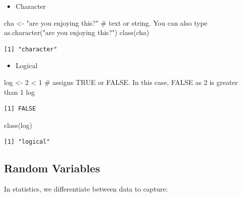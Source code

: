 \documentclass[
  letterpaper,
  DIV=11,
  numbers=noendperiod,
  oneside]{scrreprt}
\newenvironment{Shaded}{\begin{snugshade}}{\end{snugshade}}
\newcommand{\CommentTok}[1]{\textcolor[rgb]{0.37,0.37,0.37}{#1}}
\newcommand{\DecValTok}[1]{\textcolor[rgb]{0.68,0.00,0.00}{#1}}
\newcommand{\FunctionTok}[1]{\textcolor[rgb]{0.28,0.35,0.67}{#1}}
\newcommand{\NormalTok}[1]{\textcolor[rgb]{0.00,0.23,0.31}{#1}}
\newcommand{\OtherTok}[1]{\textcolor[rgb]{0.00,0.23,0.31}{#1}}
\newcommand{\SpecialCharTok}[1]{\textcolor[rgb]{0.37,0.37,0.37}{#1}}
\newcommand{\StringTok}[1]{\textcolor[rgb]{0.13,0.47,0.30}{#1}}
\providecommand{\tightlist}{%
  \setlength{\itemsep}{0pt}\setlength{\parskip}{0pt}}\usepackage{longtable,booktabs,array}
\begin{document}
\begin{itemize}
\tightlist
\item
  Character
\end{itemize}

\begin{Shaded}
\begin{Highlighting}[]
\NormalTok{cha }\OtherTok{\textless{}{-}} \StringTok{"are you enjoying this?"} \CommentTok{\# text or string. You can also type \textasciigrave{}as.character("are you enjoying this?")\textasciigrave{}}
\FunctionTok{class}\NormalTok{(cha)}
\end{Highlighting}
\end{Shaded}

\begin{verbatim}
[1] "character"
\end{verbatim}

\begin{itemize}
\tightlist
\item
  Logical
\end{itemize}

\begin{Shaded}
\begin{Highlighting}[]
\NormalTok{log }\OtherTok{\textless{}{-}} \DecValTok{2} \SpecialCharTok{\textless{}} \DecValTok{1} \CommentTok{\# assigns TRUE or FALSE. In this case, FALSE as 2 is greater than 1}
\NormalTok{log}
\end{Highlighting}
\end{Shaded}

\begin{verbatim}
[1] FALSE
\end{verbatim}

\begin{Shaded}
\begin{Highlighting}[]
\FunctionTok{class}\NormalTok{(log)}
\end{Highlighting}
\end{Shaded}

\begin{verbatim}
[1] "logical"
\end{verbatim}

\subsection{Random Variables}\label{random-variables}

In statistics, we differentiate between data to capture:
\end{document}
